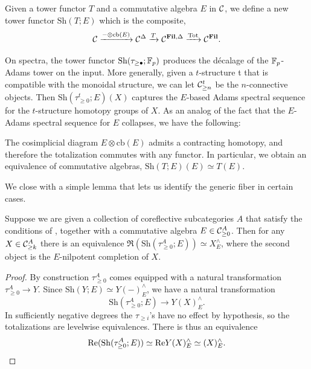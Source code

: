 \begin{cnstr}\label{cnstr:shear}
  Given a tower functor $T$ and a commutative algebra $E$ in $\CC$, we define a new tower functor $\mathrm{Sh}(T ; E)$ which is the composite,
  \[\CC \xrightarrow{- \otimes \mathrm{cb}(E)} \CC^{\Delta} \xrightarrow{T} \CC^{\Fil, \Delta} \xrightarrow{\Tot} \CC^{\Fil}.\]
\end{cnstr}

On spectra, the tower functor $\mathrm{Sh}(\tau_{\geq \bullet} ; \F_p)$ produces the d\'ecalage of the $\F_p$-Adams tower on the input. More generally, given a $t$-structure t that is compatible with the monoidal structure, we can let $\CC^t_{\geq n}$ be the $n$-connective objects.
Then $\mathrm{Sh}(\tau_{\geq 0}^t ; E)(X)$ captures the $E$-based Adams spectral sequence for the $t$-structure homotopy groups of $X$. As an analog of the fact that the $E$-Adams spectral sequence for $E$ collapses, we have the following:

\begin{exm} \label{exm:E-collapse}
  The cosimplicial diagram $E \otimes \mathrm{cb}(E)$ admits a contracting homotopy, and therefore the totalization commutes with any functor. In particular, we obtain an equivalence of commutative algebras,
  $ \mathrm{Sh}(T ; E)(E) \simeq T(E) $.
\end{exm}

We close with a simple lemma that lets us identify the generic fiber in certain cases.

\begin{lem}\label{lem:easy-conv}
  Suppose we are given a collection of coreflective subcategories $A$ that satisfy the conditions of , together with a commutative algebra $E \in \CC^A_{\geq 0}$.
  Then for any $X \in \CC_{\geq k}^A$ there is an equivalence
  $\Re(\mathrm{Sh}(\tau_{\geq 0}^A ; E)) \simeq X^{\wedge} _E$, where the second object is the $E$-nilpotent completion of $X$.
\end{lem}

\begin{proof}
  By construction $\tau^A_{\geq 0}$ comes equipped with a natural transformation $\tau^A_{\geq 0} \to Y$.
  Since $\mathrm{Sh}(Y ; E) \simeq Y(-)^{\wedge}_E$, we have a natural transformation
  \[ \mathrm{Sh}(\tau_{\geq 0}^A ; E) \to  Y(X)^{\wedge}_E.\]
  In sufficiently negative degrees the $\tau_{\geq i}$'s have no effect by hypothesis, so 
  the totalizations are levelwise equivalences.  There is thus an equivalence
  \[ \Re(\mathrm{Sh}(\tau_{\geq 0}^A ; E)) \simeq  \Re Y(X)^{\wedge} _E \simeq (X)^{\wedge} _E.\qedhere \]
\end{proof}

